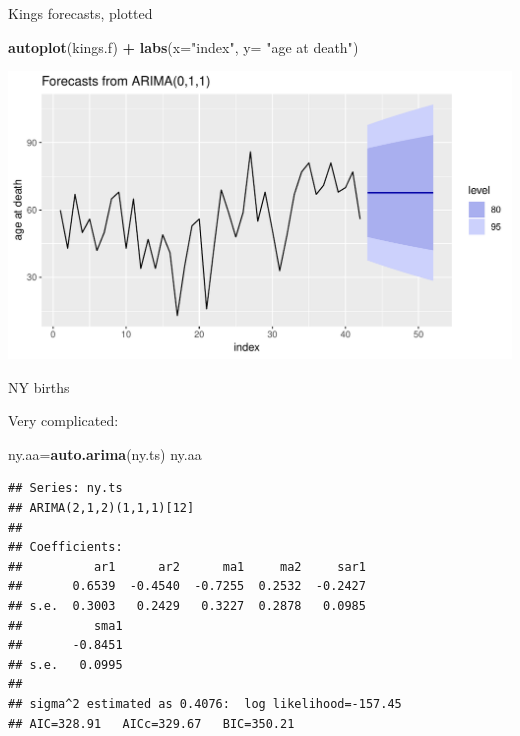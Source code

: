 \documentclass[ignorenonframetext,]{beamer}
\newenvironment{Shaded}{\begin{snugshade}}{\end{snugshade}}
\newcommand{\DataTypeTok}[1]{\textcolor[rgb]{0.13,0.29,0.53}{#1}}
\newcommand{\KeywordTok}[1]{\textcolor[rgb]{0.13,0.29,0.53}{\textbf{#1}}}
\newcommand{\NormalTok}[1]{#1}
\newcommand{\OperatorTok}[1]{\textcolor[rgb]{0.81,0.36,0.00}{\textbf{#1}}}
\newcommand{\StringTok}[1]{\textcolor[rgb]{0.31,0.60,0.02}{#1}}
\begin{document}
\begin{frame}[fragile]{Kings forecasts, plotted}
\protect\hypertarget{kings-forecasts-plotted}{}

\begin{Shaded}
\begin{Highlighting}[]
\KeywordTok{autoplot}\NormalTok{(kings.f) }\OperatorTok{+}\StringTok{ }\KeywordTok{labs}\NormalTok{(}\DataTypeTok{x=}\StringTok{"index"}\NormalTok{, }\DataTypeTok{y=} \StringTok{"age at death"}\NormalTok{)}
\end{Highlighting}
\end{Shaded}

\includegraphics{figure/unnamed-chunk-60-1.pdf}

\end{frame}

\begin{frame}[fragile]{NY births}
\protect\hypertarget{ny-births}{}

Very complicated:

\small

\begin{Shaded}
\begin{Highlighting}[]
\NormalTok{ny.aa=}\KeywordTok{auto.arima}\NormalTok{(ny.ts)}
\NormalTok{ny.aa}
\end{Highlighting}
\end{Shaded}

\begin{verbatim}
## Series: ny.ts 
## ARIMA(2,1,2)(1,1,1)[12] 
## 
## Coefficients:
##          ar1      ar2      ma1     ma2     sar1
##       0.6539  -0.4540  -0.7255  0.2532  -0.2427
## s.e.  0.3003   0.2429   0.3227  0.2878   0.0985
##          sma1
##       -0.8451
## s.e.   0.0995
## 
## sigma^2 estimated as 0.4076:  log likelihood=-157.45
## AIC=328.91   AICc=329.67   BIC=350.21
\end{verbatim}

\normalsize

\end{frame}
\end{document}

